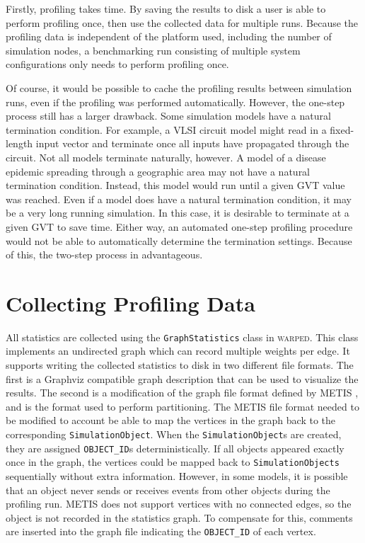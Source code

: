 \documentclass[11pt]{book}
\begin{document}
Firstly, profiling takes time. By saving the results to disk a user is able to perform profiling once, then use the collected data for multiple runs. Because the profiling data is independent of the platform used, including the number of simulation nodes, a benchmarking run consisting of multiple system configurations only needs to perform profiling once.

Of course, it would be possible to cache the profiling results between simulation runs, even if the profiling was performed automatically. However, the one-step process still has a larger drawback. Some simulation models have a natural termination condition. For example, a VLSI circuit model might read in a fixed-length input vector and terminate once all inputs have propagated through the circuit. Not all models terminate naturally, however. A model of a disease epidemic spreading through a geographic area may not have a natural termination condition. Instead, this model would run until a given GVT value was reached. Even if a model does have a natural termination condition, it may be a very long running simulation. In this case, it is desirable to terminate at a given GVT to save time. Either way, an automated one-step profiling procedure would not be able to automatically determine the termination settings. Because of this, the two-step process in advantageous.

\section{Collecting Profiling Data}\label{sec:collectingProfilingData}

All statistics are collected using the \texttt{GraphStatistics} class in \textsc{warped}. This class implements an undirected graph which can record multiple weights per edge. It supports writing the collected statistics to disk in two different file formats. The first is a Graphviz compatible graph description that can be used to visualize the results. The second is a modification of the graph file format defined by METIS \cite{karypis-11}, and is the format used to perform partitioning. The METIS file format needed to be modified to account be able to map the vertices in the graph back to the corresponding \texttt{SimulationObject}. When the \texttt{SimulationObject}s are created, they are assigned \texttt{OBJECT\_ID}s deterministically. If all objects appeared exactly once in the graph, the vertices could be mapped back to \texttt{SimulationObjects} sequentially without extra information. However, in some models, it is possible that an object never sends or receives events from other objects during the profiling run. METIS does not support vertices with no connected edges, so the object is not recorded in the statistics graph. To compensate for this, comments are inserted into the graph file indicating the \texttt{OBJECT\_ID} of each vertex.
\end{document}
